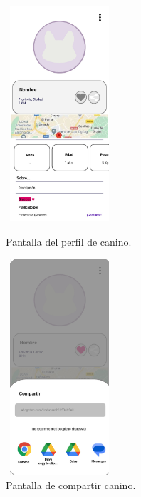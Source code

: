 \documentclass[a4paper, 12pt]{article}
\begin{document}
\begin{figure}[H]
   	\begin{minipage}{0.48\textwidth}
		\begin{center}
			{\includegraphics[height=8cm, width=4cm]{design/DogProfile.jpg}\par}
			\caption{Pantalla del perfil de canino.}
			\medskip
		\end{center}  
	\end{minipage}\hfill
   	\begin{minipage}{0.48\textwidth}
		\begin{center}
			{\includegraphics[height=8cm, width=4cm]{design/ShareAction.jpg}\par}
			\caption{Pantalla de compartir canino.}
			\medskip
		\end{center}  
	\end{minipage}\hfill
\end{figure}
\end{document}
